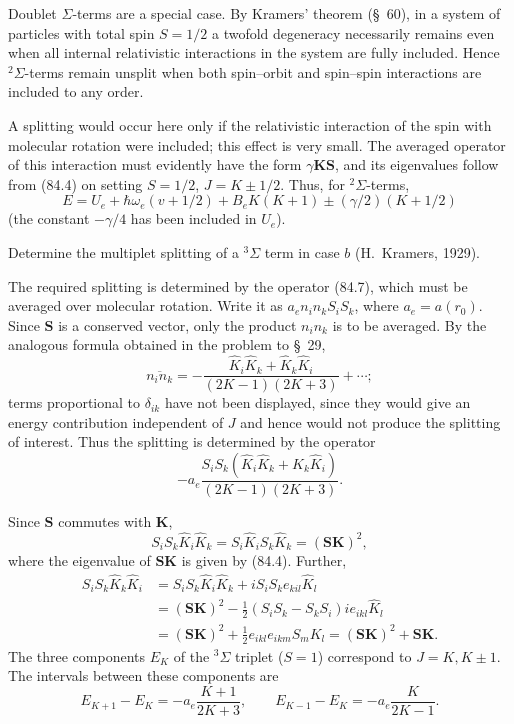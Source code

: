Doublet $\Sigma$-terms are a special case. By Kramers' theorem (\S~60), in a system of particles with total spin $S=1/2$ a twofold degeneracy necessarily remains even when all internal relativistic interactions in the system are fully included. Hence ${}^2\Sigma$-terms remain unsplit when both spin--orbit and spin--spin interactions are included to any order.

A splitting would occur here only if the relativistic interaction of the spin with molecular rotation were included; this effect is very small. The averaged operator of this interaction must evidently have the form $\gamma\mathbf K\mathbf S$, and its eigenvalues follow from (84.4) on setting $S=1/2$, $J=K\pm1/2$. Thus, for ${}^2\Sigma$-terms,
\begin{equation}
 E=U_e+\hbar\omega_e(v+1/2)+B_eK(K+1)\pm(\gamma/2)(K+1/2)
 \tag{84.8}
\end{equation}
(the constant $-\gamma/4$ has been included in $U_e$).

\ProblemHeading[1] Determine the multiplet splitting of a ${}^3\Sigma$ term in case $b$ (H.~Kramers, 1929).

\SolutionHeading The required splitting is determined by the operator (84.7), which must be averaged over molecular rotation. Write it as $a_en_in_kS_iS_k$, where $a_e=a(r_0)$. Since $\mathbf S$ is a conserved vector, only the product $n_in_k$ is to be averaged. By the analogous formula obtained in the problem to \S~29,
\[
 \overline{n_in_k}=-\frac{\widehat K_i\widehat K_k+\widehat K_k\widehat K_i}{(2K-1)(2K+3)}+\cdots;
\]
terms proportional to $\delta_{ik}$ have not been displayed, since they would give an energy contribution independent of $J$ and hence would not produce the splitting of interest. Thus the splitting is determined by the operator
\[
 -a_e\frac{S_iS_k(\widehat K_i\widehat K_k+\widehat K_k\widehat K_i)}{(2K-1)(2K+3)}.
\]

Since $\mathbf S$ commutes with $\mathbf K$,
\[
 S_iS_k\widehat K_i\widehat K_k=S_i\widehat K_iS_k\widehat K_k=(\mathbf S\mathbf K)^2,
\]
where the eigenvalue of $\mathbf S\mathbf K$ is given by (84.4). Further,
\begin{align*}
 S_iS_k\widehat K_k\widehat K_i
 &=S_iS_k\widehat K_i\widehat K_k+iS_iS_k e_{kil}\widehat K_l\\
 &=(\mathbf S\mathbf K)^2-\frac12(S_iS_k-S_kS_i)i e_{ikl}\widehat K_l\\
 &=(\mathbf S\mathbf K)^2+\frac12e_{ikl}e_{ikm}S_mK_l
  =(\mathbf S\mathbf K)^2+\mathbf S\mathbf K.
\end{align*}
The three components $E_K$ of the ${}^3\Sigma$ triplet ($S=1$) correspond to $J=K,K\pm1$. The intervals between these components are
\[
 E_{K+1}-E_K=-a_e\frac{K+1}{2K+3},\qquad
 E_{K-1}-E_K=-a_e\frac{K}{2K-1}.
\]

